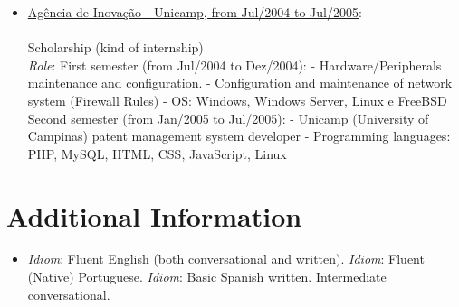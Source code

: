 \documentclass[a4paper,11pt]{article}
\begin{document}
\begin{itemize}
\item \underline{Agência de Inovação - Unicamp, from Jul/2004 to Jul/2005}:\\
{\small \\ 
  Scholarship (kind of internship)\\
  \emph{Role}:
  \subitem First semester (from Jul/2004 to Dez/2004):
	  \subsubitem - Hardware/Peripherals maintenance and configuration. 
	  \subsubitem - Configuration and maintenance of network system (Firewall Rules)
	  \subsubitem - OS: Windows, Windows Server, Linux e FreeBSD
 \subitem Second semester (from Jan/2005 to Jul/2005):
	  \subsubitem - Unicamp (University of Campinas) patent management system developer
	  \subsubitem - Programming languages: PHP, MySQL, HTML, CSS, JavaScript, Linux 
}
 
\end{itemize}
\section{Additional Information}
\begin{itemize}
\item 
\subitem \emph{Idiom}: Fluent English (both conversational and written).
\subitem  \emph{Idiom}: Fluent (Native) Portuguese.
\subitem  \emph{Idiom}: Basic Spanish written. Intermediate conversational.
\end{itemize}
\end{document}
